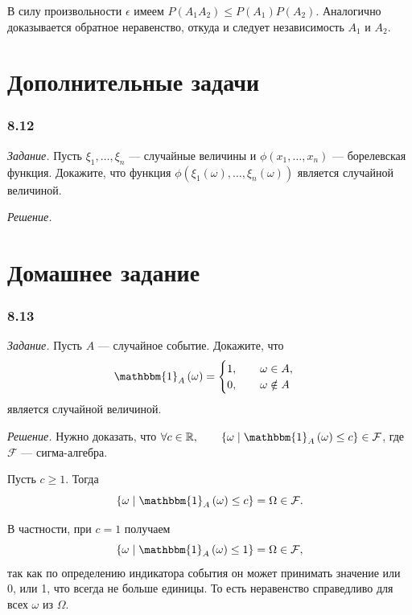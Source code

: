 В силу произвольности $ \epsilon $ имеем $P \left( A_1 A_2 \right) \leq P \left( A_1 \right) P \left( A_2 \right) $.
Аналогично доказывается обратное неравенство, откуда и следует независимость $A_1$ и $A_2$.

\section*{Дополнительные задачи}

\subsubsection*{8.12}

\textit{Задание.} Пусть $ \xi_1, \dotsc, \xi_n $ --- случайные величины и $ \phi \left( x_1, \dotsc, x_n \right) $ --- борелевская функция.
Докажите, что функция $ \phi \left( \xi_1 \left( \omega \right), \dotsc, \xi_n \left( \omega \right) \right) $ является случайной величиной.

\textit{Решение.}

\section*{Домашнее задание}

\subsubsection*{8.13}

\textit{Задание.} Пусть $A$ --- случайное событие.
Докажите, что
$$ \mathbbm{1}_A \left( \omega \right) =
\begin{cases}
1, \qquad \omega \in A, \\
0, \qquad \omega \notin A
\end{cases}$$
является случайной величиной.

\textit{Решение.}
Нужно доказать,
что $ \forall c \in \mathbb{R}, \qquad \left\{ \omega \; \middle| \; \mathbbm{1}_A \left( \omega \right) \leq c \right\} \in \mathcal{F} $,
где $ \mathcal{F} $ --- сигма-алгебра.

Пусть $c \geq 1$.
Тогда
$$ \left\{ \omega \; \middle| \;
\mathbbm{1}_A \left( \omega \right) \leq
c \right\} =
\Omega \in
\mathcal{F}.$$

В частности, при $c = 1$ получаем
$$ \left\{ \omega \; \middle| \;
\mathbbm{1}_A \left( \omega \right) \leq
1 \right\} =
\Omega \in
\mathcal{F},$$
так как по определению индикатора события он может принимать значение или 0, или 1, что всегда не больше единицы.
То есть неравенство справедливо для всех $ \omega $ из $ \Omega $.

